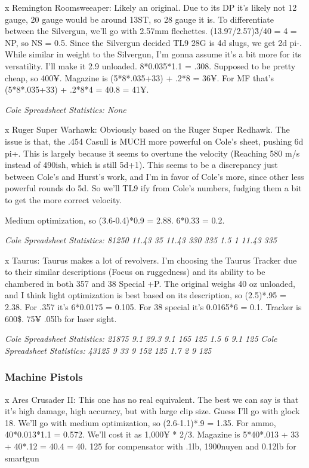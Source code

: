 \begin{multicols*}{2}
	x Remington Roomsweeaper: Likely an original. Due to its DP it's likely not 12 gauge, 20 gauge would be around 13ST, so 28 gauge it is. To differentiate between the Silvergun, we'll go with 2.57mm flechettes. (13.97/2.57)\^3/40 = 4 = NP, so NS = 0.5. Since the Silvergun decided TL9 28G is 4d slugs, we get 2d pi-. While similar in weight to the Silvergun, I'm gonna assume it's a bit more for its versatility. I'll make it 2.9 unloaded. 8*0.035*1.1 = .308. Supposed to be pretty cheap, so 400¥. Magazine is (5*8*.035+33) + .2*8 = 36¥. For MF that's (5*8*.035+33) + .2*8*4 = 40.8 = 41¥.
	
	\textit{\textcolor{OliveGreen}{Cole Spreadsheet Statistics: None}}
	
	x Ruger Super Warhawk: Obviously based on the Ruger Super Redhawk. The issue is that, the .454 Casull is MUCH more powerful on Cole's sheet, pushing 6d pi+. This is largely because it seems to overtune the velocity (Reaching 580 m/s instead of 490ish, which is still 5d+1). This seems to be a discrepancy just between Cole's and Hurst's work, and I'm in favor of Cole's more, since other less powerful rounds do 5d. So we'll TL9 ify from Cole's numbers, fudging them a bit to get the more correct velocity.
	
	Medium optimization, so (3.6-0.4)*0.9 = 2.88. 6*0.33 = 0.2. 
	
	\textit{\textcolor{OliveGreen}{Cole Spreadsheet Statistics: 81250 11.43 35 11.43 330 335 1.5 1 11.43 335}}
	
	x Taurus: Taurus makes a lot of revolvers. I'm choosing the Taurus Tracker due to their similar descriptions (Focus on ruggedness) and its ability to be chambered in both 357 and 38 Special +P. The original weighs 40 oz unloaded, and I think light optimization is best based on its description, so (2.5)*.95 = 2.38. For .357 it's 6*0.0175 = 0.105. For 38 special it's 0.0165*6 = 0.1. Tracker is 600\$. 75¥ .05lb for laser sight.
	
	\textit{\textcolor{OliveGreen}{Cole Spreadsheet Statistics: 21875 9.1 29.3 9.1 165 125 1.5 6 9.1 125}}
	\textit{\textcolor{OliveGreen}{Cole Spreadsheet Statistics: 43125 9 33 9 152 125 1.7 2 9 125}}
	
	\subsubsection{Machine Pistols}
	
	x Ares Crusader II: This one has no real equivalent. The best we can say is that it's high damage, high accuracy, but with large clip size. Guess I'll go with glock 18. We'll go with medium optimization, so (2.6-1.1)*.9 = 1.35. For ammo, 40*0.013*1.1 = 0.572. We'll cost it as 1,000¥ * 2/3. Magazine is 5*40*.013 + 33 + 40*.12 = 40.4 = 40. 125 for compensator with .1lb, 1900nuyen and 0.12lb for smartgun
	

\end{multicols*}
